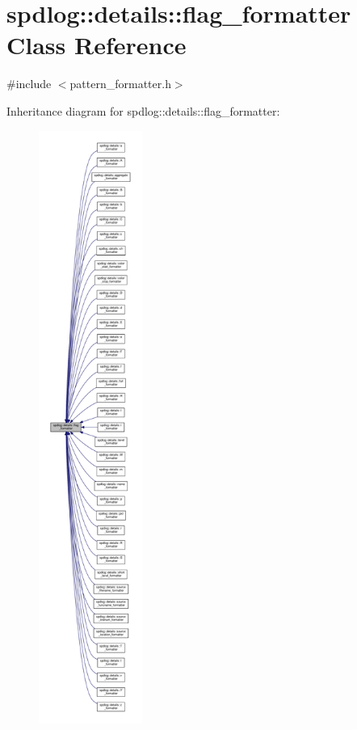 \hypertarget{classspdlog_1_1details_1_1flag__formatter}{}\section{spdlog\+:\+:details\+:\+:flag\+\_\+formatter Class Reference}
\label{classspdlog_1_1details_1_1flag__formatter}


{\ttfamily \#include $<$pattern\+\_\+formatter.\+h$>$}



Inheritance diagram for spdlog\+:\+:details\+:\+:flag\+\_\+formatter\+:
\nopagebreak
\begin{figure}[H]
\begin{center}
\leavevmode
\includegraphics[height=550pt]{classspdlog_1_1details_1_1flag__formatter__inherit__graph}
\end{center}
\end{figure}


